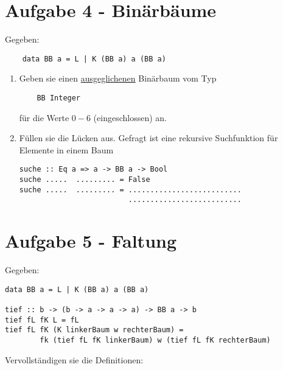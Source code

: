 \documentclass{article}
\begin{document}
\newpage

\section*{Aufgabe 4 - Binärbäume}
Gegeben:
\begin{verbatim}
    data BB a = L | K (BB a) a (BB a)
\end{verbatim}

\begin{enumerate} [label={\alph*)}]
    \item Geben sie einen \href{http://www.hs-augsburg.de/mebib/emiel/entw_inf/lernprogramme/baeume/gdi_kap_4_2.html}{ausgeglichenen} Binärbaum vom Typ
\begin{verbatim}
    BB Integer
\end{verbatim}
    für die Werte $0-6$ (eingeschlossen) an.

    \item Füllen sie die Lücken aus. Gefragt ist eine rekursive Suchfunktion für Elemente in einem Baum
\begin{verbatim}
suche :: Eq a => a -> BB a -> Bool
suche .....  ......... = False
suche .....  ......... = ..........................
                         ..........................
\end{verbatim}
\end{enumerate}

\section*{Aufgabe 5 - Faltung}
Gegeben:
\begin{verbatim}
data BB a = L | K (BB a) a (BB a)

tief :: b -> (b -> a -> a -> a) -> BB a -> b
tief fL fK L = fL
tief fL fK (K linkerBaum w rechterBaum) =
        fk (tief fL fK linkerBaum) w (tief fL fK rechterBaum)
\end{verbatim}

Vervollständigen sie die Definitionen:
\end{document}
